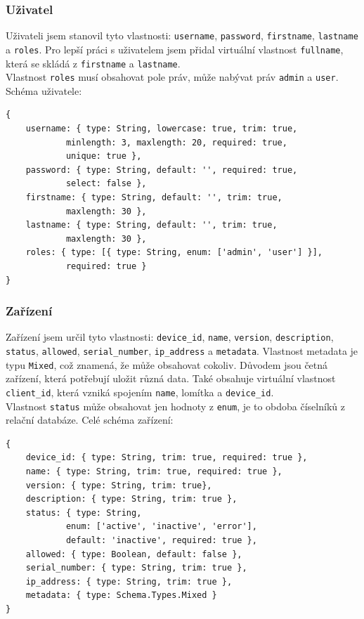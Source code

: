 \documentclass[czech,BP]{thesiskiv}
\begin{document}
	\subsubsection{Uživatel}
Uživateli jsem stanovil tyto vlastnosti: \texttt{username}, \texttt{password}, \texttt{firstname}, \texttt{lastname} a \texttt{roles}. Pro lepší práci s uživatelem jsem přidal virtuální vlastnost \texttt{fullname}, která se skládá z \texttt{firstname} a \texttt{lastname}.\\
Vlastnost \texttt{roles} musí obsahovat pole práv, může nabývat práv \texttt{admin} a \texttt{user}.
Schéma uživatele:
\begingroup
\fontsize{10pt}{12pt}\selectfont
\begin{verbatim}
{
    username: { type: String, lowercase: true, trim: true,
            minlength: 3, maxlength: 20, required: true,
            unique: true },
    password: { type: String, default: '', required: true,
            select: false },
    firstname: { type: String, default: '', trim: true,
            maxlength: 30 },
    lastname: { type: String, default: '', trim: true,
            maxlength: 30 },
    roles: { type: [{ type: String, enum: ['admin', 'user'] }],
            required: true }
}
\end{verbatim}
\endgroup
	
	\subsubsection{Zařízení}

Zařízení jsem určil tyto vlastnosti: \texttt{device\_id}, \texttt{name}, \texttt{version}, \texttt{description}, \texttt{status}, \texttt{allowed}, \texttt{serial\_number}, \texttt{ip\_address} a \texttt{metadata}. 
Vlastnost metadata je typu \texttt{Mixed}, což znamená, že může obsahovat cokoliv.
Důvodem jsou četná zařízení, která potřebují uložit různá data. 
Také obsahuje virtuální vlastnost \texttt{client\_id}, která vzniká spojením \texttt{name}, lomítka a \texttt{device\_id}.\\
Vlastnost \texttt{status} může obsahovat jen hodnoty z \texttt{enum}, je to obdoba číselníků z relační databáze. 
Celé schéma zařízení:
\begingroup
\fontsize{10pt}{12pt}\selectfont
\begin{verbatim}
{
    device_id: { type: String, trim: true, required: true },
    name: { type: String, trim: true, required: true },
    version: { type: String, trim: true},
    description: { type: String, trim: true },
    status: { type: String,
            enum: ['active', 'inactive', 'error'],
            default: 'inactive', required: true },
    allowed: { type: Boolean, default: false },
    serial_number: { type: String, trim: true },
    ip_address: { type: String, trim: true },
    metadata: { type: Schema.Types.Mixed }
}
\end{verbatim}
\endgroup
\end{document}
